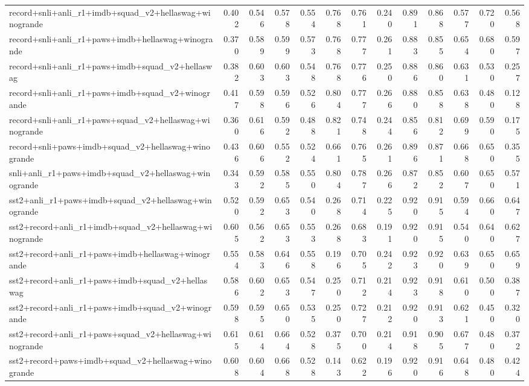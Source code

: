 \begin{table}[t]
\begin{tabular}{lrrrrrrrrrrrr}
    record+snli+anli\_r1+imdb+squad\_v2+hellaswag+winogrande & 0.402 & 0.546 & 0.578 & 0.554 & 0.768 & 0.761 & 0.240 & 0.891 & 0.868 & 0.577 & 0.720 & 0.568 \\
    record+snli+anli\_r1+paws+imdb+hellaswag+winogrande & 0.370 & 0.589 & 0.599 & 0.573 & 0.768 & 0.777 & 0.261 & 0.883 & 0.855 & 0.654 & 0.680 & 0.597 \\
    record+snli+anli\_r1+paws+imdb+squad\_v2+hellaswag & 0.382 & 0.603 & 0.603 & 0.548 & 0.768 & 0.776 & 0.250 & 0.886 & 0.860 & 0.631 & 0.530 & 0.257 \\
    record+snli+anli\_r1+paws+imdb+squad\_v2+winogrande & 0.417 & 0.598 & 0.596 & 0.526 & 0.804 & 0.777 & 0.266 & 0.880 & 0.858 & 0.638 & 0.480 & 0.128 \\
    record+snli+anli\_r1+paws+squad\_v2+hellaswag+winogrande & 0.360 & 0.616 & 0.592 & 0.488 & 0.821 & 0.748 & 0.244 & 0.856 & 0.812 & 0.699 & 0.590 & 0.175 \\
    record+snli+paws+imdb+squad\_v2+hellaswag+winogrande & 0.436 & 0.606 & 0.552 & 0.524 & 0.661 & 0.765 & 0.261 & 0.896 & 0.871 & 0.668 & 0.650 & 0.355 \\
    snli+anli\_r1+paws+imdb+squad\_v2+hellaswag+winogrande & 0.343 & 0.592 & 0.585 & 0.550 & 0.804 & 0.787 & 0.266 & 0.872 & 0.852 & 0.607 & 0.650 & 0.571 \\
    sst2+anli\_r1+paws+imdb+squad\_v2+hellaswag+winogrande & 0.520 & 0.592 & 0.653 & 0.540 & 0.268 & 0.714 & 0.225 & 0.920 & 0.915 & 0.594 & 0.660 & 0.647 \\
    sst2+record+anli\_r1+imdb+squad\_v2+hellaswag+winogrande & 0.605 & 0.562 & 0.653 & 0.553 & 0.268 & 0.683 & 0.191 & 0.920 & 0.915 & 0.540 & 0.640 & 0.627 \\
    sst2+record+anli\_r1+paws+imdb+hellaswag+winogrande & 0.554 & 0.583 & 0.646 & 0.558 & 0.196 & 0.705 & 0.242 & 0.923 & 0.920 & 0.639 & 0.650 & 0.659 \\
    sst2+record+anli\_r1+paws+imdb+squad\_v2+hellaswag & 0.586 & 0.602 & 0.653 & 0.547 & 0.250 & 0.712 & 0.214 & 0.923 & 0.918 & 0.610 & 0.500 & 0.387 \\
    sst2+record+anli\_r1+paws+imdb+squad\_v2+winogrande & 0.598 & 0.595 & 0.650 & 0.535 & 0.250 & 0.727 & 0.212 & 0.920 & 0.913 & 0.621 & 0.450 & 0.320 \\
    sst2+record+anli\_r1+paws+squad\_v2+hellaswag+winogrande & 0.615 & 0.614 & 0.664 & 0.528 & 0.375 & 0.700 & 0.214 & 0.918 & 0.905 & 0.677 & 0.480 & 0.372 \\
    sst2+record+paws+imdb+squad\_v2+hellaswag+winogrande & 0.608 & 0.604 & 0.668 & 0.528 & 0.143 & 0.622 & 0.196 & 0.920 & 0.916 & 0.648 & 0.480 & 0.424 \\

\end{tabular}
\end{table}
